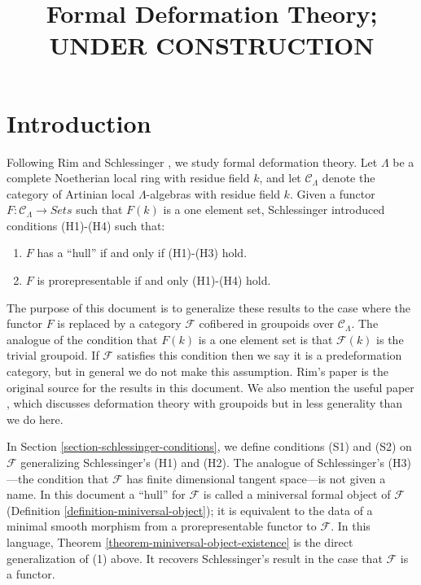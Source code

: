 


%


\title{Formal Deformation Theory; UNDER CONSTRUCTION}


\maketitle

\label{section-phantom}

\tableofcontents



\section{Introduction}
\label{section-introduction}

\noindent
Following Rim \cite[Exposee VI]{SGA7-I} and Schlessinger \cite{Sch}, we 
study formal deformation theory. Let $\Lambda$ be a complete Noetherian local 
ring with residue field $k$, and let $\mathcal{C}_\Lambda$ denote the category 
of Artinian local $\Lambda$-algebras with residue field $k$.  Given a functor 
$F: \mathcal{C}_\Lambda \to \textit{Sets}$ such that $F(k)$ is a 
one element set, Schlessinger \cite{Sch} introduced conditions 
(H1)-(H4) such that: 
\begin{enumerate}
\item $F$ has a ``hull'' if and only if (H1)-(H3) hold.
\item $F$ is prorepresentable if and only (H1)-(H4) hold.
\end{enumerate} 
The purpose of this document is to generalize these results to the case where 
the functor $F$ is replaced by a category $\mathcal{F}$ cofibered in groupoids 
over $\mathcal{C}_\Lambda$.  The analogue of the condition that $F(k)$ is a 
one element set is that $\mathcal{F}(k)$ is the trivial groupoid. If
$\mathcal{F}$ satisfies this condition then we say it is a predeformation
category, but in  general we do not make this assumption.  Rim's paper
\cite[Exposee VI]{SGA7-I} is the original 
source for the results in this document.  We also mention the useful paper 
\cite{Vistoli}, which discusses deformation theory with groupoids but in less 
generality than we do here.
  
\medskip \noindent
In
Section \ref{section-schlessinger-conditions},
we define conditions (S1) and (S2) 
on $\mathcal{F}$ generalizing Schlessinger's (H1) and (H2).  The analogue of 
Schlessinger's (H3)---the condition that $\mathcal{F}$ has finite dimensional 
tangent space---is not given a name.  In this document a ``hull'' for $\mathcal 
F$ is called a miniversal formal object of $\mathcal{F}$ (Definition 
\ref{definition-miniversal-object}); it is equivalent to the data of a minimal 
smooth morphism from a prorepresentable functor to $\mathcal{F}$.  In this 
language, Theorem \ref{theorem-miniversal-object-existence} is the direct 
generalization of (1) above. It recovers Schlessinger's result in the case that 
$\mathcal{F}$ is a functor.

